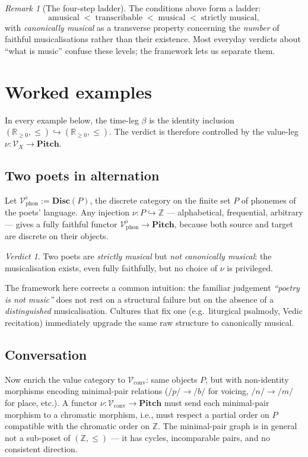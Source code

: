 \documentclass[11pt]{article}
\theoremstyle{definition}
\theoremstyle{plain}
\theoremstyle{remark}
\newtheorem*{remark}{Remark}
\newtheorem*{verdict}{Verdict}
\newcommand{\V}{\mathcal{V}}
\newcommand{\Pitch}{\mathbf{Pitch}}
\newcommand{\Disc}{\mathbf{Disc}}
\newcommand{\R}{\mathbb{R}}
\newcommand{\Z}{\mathbb{Z}}
\begin{document}
\begin{remark}[The four-step ladder]
The conditions above form a ladder:
\[
\text{amusical}
\;<\; \text{transcribable}
\;<\; \text{musical}
\;<\; \text{strictly musical},
\]
with \emph{canonically musical} as a transverse property concerning
the \emph{number} of faithful musicalisations rather than their
existence. Most everyday verdicts about ``what is music'' confuse
these levels; the framework lets us separate them.
\end{remark}

\section{Worked examples}

In every example below, the time-leg $\beta$ is the identity
inclusion $(\R_{\geq 0}, \leq) \hookrightarrow (\R_{\geq 0}, \leq)$.
The verdict is therefore controlled by the value-leg
$\nu : \V_X \to \Pitch$.

\subsection{Two poets in alternation}
Let $\V_{\mathrm{phon}}^\flat := \Disc(P)$, the discrete category on
the finite set $P$ of phonemes of the poets' language. Any injection
$\nu : P \hookrightarrow \Z$ — alphabetical, frequential, arbitrary
— gives a fully faithful functor $\V_{\mathrm{phon}}^\flat \to \Pitch$,
because both source and target are discrete on their objects.

\begin{verdict}
Two poets are \emph{strictly musical} but \emph{not canonically
musical}: the musicalisation exists, even fully faithfully, but no
choice of $\nu$ is privileged.
\end{verdict}

\noindent The framework here corrects a common intuition: the
familiar judgement \emph{``poetry is not music''} does not rest on a
structural failure but on the absence of a \emph{distinguished}
musicalisation. Cultures that fix one (e.g.\ liturgical psalmody, Vedic
recitation) immediately upgrade the same raw structure to canonically
musical.

\subsection{Conversation}
Now enrich the value category to $\V_{\mathrm{conv}}$: same objects $P$,
but with non-identity morphisms encoding minimal-pair relations
($/p/ \to /b/$ for voicing, $/n/ \to /m/$ for place, etc.). A functor
$\nu : \V_{\mathrm{conv}} \to \Pitch$ must send each minimal-pair
morphism to a chromatic morphism, i.e., must respect a partial order
on $P$ compatible with the chromatic order on $\Z$. The minimal-pair
graph is in general not a sub-poset of $(\Z, \leq)$ — it has cycles,
incomparable pairs, and no consistent direction.
\end{document}
